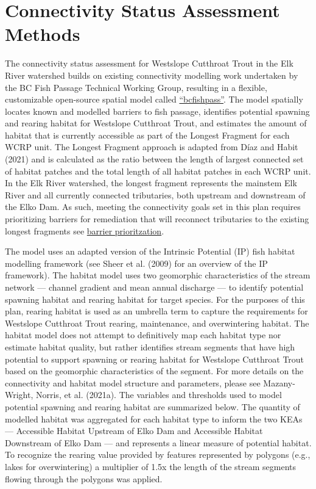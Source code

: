 \documentclass[
  letterpaper,
  DIV=11,
  numbers=noendperiod]{scrreprt}
\begin{document}
\section*{Connectivity Status Assessment
Methods}\label{connectivity-status-assessment-methods}


The connectivity status assessment for Westslope Cutthroat Trout in the
Elk River watershed builds on existing connectivity modelling work
undertaken by the BC Fish Passage Technical Working Group, resulting in
a flexible, customizable open-source spatial model called
\href{https://github.com/smnorris/bcfishpass}{``bcfishpass''}. The model
spatially locates known and modelled barriers to fish passage,
identifies potential spawning and rearing habitat for Westslope
Cutthroat Trout, and estimates the amount of habitat that is currently
accessible as part of the Longest Fragment for each WCRP unit. The
Longest Fragment approach is adapted from Díaz and Habit (2021) and is
calculated as the ratio between the length of largest connected set of
habitat patches and the total length of all habitat patches in each WCRP
unit. In the Elk River watershed, the longest fragment represents the
mainstem Elk River and all currently connected tributaries, both
upstream and downstream of the Elko Dam. As such, meeting the
connectivity goals set in this plan requires prioritizing barriers for
remediation that will reconnect tributaries to the existing longest
fragments see \href{barrier-prioritization.qmd}{barrier prioritzation}.

The model uses an adapted version of the Intrinsic Potential (IP) fish
habitat modelling framework (see Sheer et al. (2009) for an overview of
the IP framework). The habitat model uses two geomorphic characteristics
of the stream network --- channel gradient and mean annual discharge ---
to identify potential spawning habitat and rearing habitat for target
species. For the purposes of this plan, rearing habitat is used as an
umbrella term to capture the requirements for Westslope Cutthroat Trout
rearing, maintenance, and overwintering habitat. The habitat model does
not attempt to definitively map each habitat type nor estimate habitat
quality, but rather identifies stream segments that have high potential
to support spawning or rearing habitat for Westslope Cutthroat Trout
based on the geomorphic characteristics of the segment. For more details
on the connectivity and habitat model structure and parameters, please
see Mazany-Wright, Norris, et al. (2021a). The variables and thresholds
used to model potential spawning and rearing habitat are summarized
below. The quantity of modelled habitat was aggregated for each habitat
type to inform the two KEAs --- Accessible Habitat Upstream of Elko Dam
and Accessible Habitat Downstream of Elko Dam --- and represents a
linear measure of potential habitat. To recognize the rearing value
provided by features represented by polygons (e.g., lakes for
overwintering) a multiplier of 1.5x the length of the stream segments
flowing through the polygons was applied.
\end{document}
